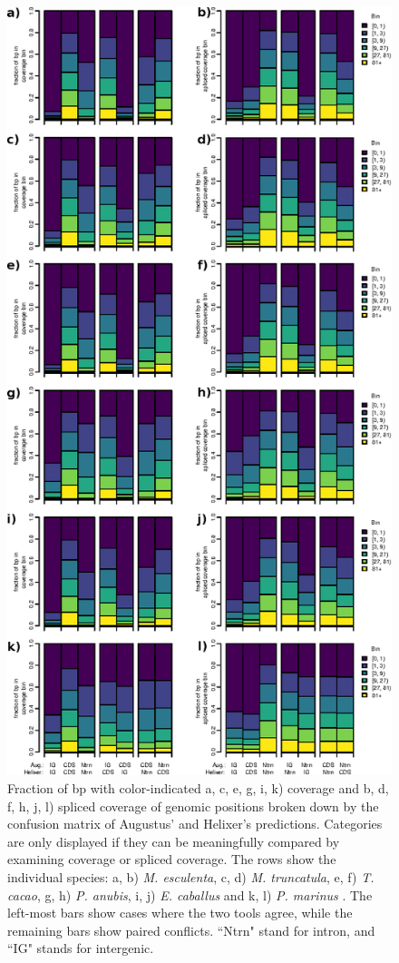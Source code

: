 \documentclass{article}
\renewcommand{\thefigure}{S\arabic{figure}}
\begin{document}
\begin{figure}[!h]
\label{supfig:each_sp_vs_augustus}
\centerline{\includegraphics[]{images/cov_examples/each_sp_vs_augustus}}
\caption{
Fraction of bp with color-indicated a, c, e, g, i, k) coverage and b, d, f, h, j, l) spliced coverage of genomic positions
broken down by the confusion matrix of Augustus' and Helixer's predictions. Categories
are only displayed if they can be meaningfully compared by examining coverage or spliced
coverage. The rows show the individual species: a, b) {\it M. esculenta}, c, d) {\it M. truncatula}, 
e, f) {\it T. cacao}, g, h) {\it P. anubis}, i, j) {\it E. caballus} and k, l) {\it P. marinus} . 
The left-most bars show cases where the two tools agree,
while the remaining bars show paired conflicts. ``Ntrn" stand
for intron, and ``IG" stands for intergenic.
}
\end{figure}
\end{document}
